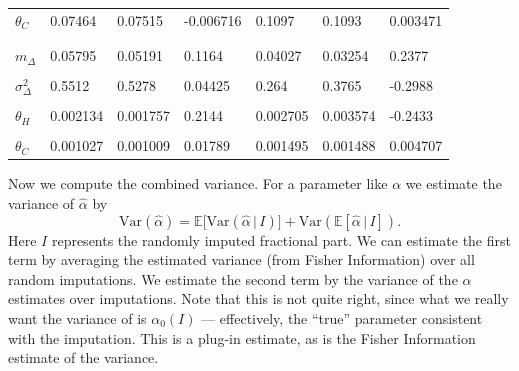 \documentclass[
]{article}
\begin{document}
\begin{table}[!h]
\begin{tabular}[t]{lllllll}
\hspace{1em}$\theta_C$ & 0.07464 & 0.07515 & -0.006716 & 0.1097 & 0.1093 & 0.003471\\
\addlinespace[0.3em]
\multicolumn{7}{l}{\textbf{Parameter SE estimates}}\\
\cellcolor{gray!10}{\hspace{1em}$m_M$} & \cellcolor{gray!10}{0.1613} & \cellcolor{gray!10}{0.2538} & \cellcolor{gray!10}{-0.3642} & \cellcolor{gray!10}{0.08481} & \cellcolor{gray!10}{0.089} & \cellcolor{gray!10}{-0.04704}\\
\hspace{1em}$m_\Delta$ & 0.05795 & 0.05191 & 0.1164 & 0.04027 & 0.03254 & 0.2377\\
\cellcolor{gray!10}{\hspace{1em}$\sigma^2_M$} & \cellcolor{gray!10}{4.424} & \cellcolor{gray!10}{5.488} & \cellcolor{gray!10}{-0.1937} & \cellcolor{gray!10}{1.211} & \cellcolor{gray!10}{1.211} & \cellcolor{gray!10}{-0.0002281}\\
\hspace{1em}$\sigma^2_\Delta$ & 0.5512 & 0.5278 & 0.04425 & 0.264 & 0.3765 & -0.2988\\
\cellcolor{gray!10}{\hspace{1em}$\alpha_H$} & \cellcolor{gray!10}{0.05527} & \cellcolor{gray!10}{0.03282} & \cellcolor{gray!10}{0.6843} & \cellcolor{gray!10}{0.06437} & \cellcolor{gray!10}{0.07006} & \cellcolor{gray!10}{-0.08116}\\
\hspace{1em}$\theta_H$ & 0.002134 & 0.001757 & 0.2144 & 0.002705 & 0.003574 & -0.2433\\
\cellcolor{gray!10}{\hspace{1em}$\alpha_C$} & \cellcolor{gray!10}{0.07965} & \cellcolor{gray!10}{0.06315} & \cellcolor{gray!10}{0.2613} & \cellcolor{gray!10}{0.08608} & \cellcolor{gray!10}{0.1047} & \cellcolor{gray!10}{-0.1777}\\
\hspace{1em}$\theta_C$ & 0.001027 & 0.001009 & 0.01789 & 0.001495 & 0.001488 & 0.004707\\
\bottomrule
\end{tabular}
\end{table}

Now we compute the combined variance. For a parameter like \(\alpha\) we estimate the variance of \(\hat\alpha\) by
\newcommand{\E}{\mathbb{E}}
\renewcommand{\P}{\mathbb{P}}
\[
  \mathrm{Var}(\hat\alpha) = \mathbb{E}\bigl[ \mathrm{Var}\left(\hat\alpha\, |\, I\right)\bigr] + \mathrm{Var}\left(\mathbb{E} \left[ \hat\alpha\, |\, I \right]\right).
\]
Here \(I\) represents the randomly imputed fractional part.
We can estimate the first term by averaging the estimated variance (from Fisher Information) over all random imputations.
We estimate the second term by the variance of the \(\alpha\) estimates over imputations. Note that this is not quite right, since what we really
want the variance of is \(\alpha_0(I)\) --- effectively, the ``true'' parameter consistent with the imputation. This is a plug-in estimate,
as is the Fisher Information estimate of the variance.
\end{document}
